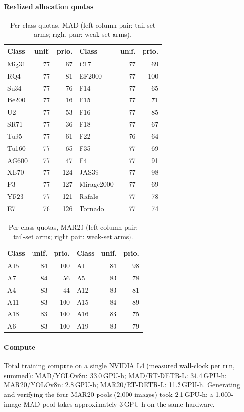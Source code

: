 \paragraph{Realized allocation quotas}
\begin{table}[h]\centering\small\caption{Per-class quotas, MAD (left column pair: tail-set arms; right pair: weak-set arms).}
\begin{tabular}{lrr@{\qquad}lrr}\toprule
Class & unif. & prio. & Class & unif. & prio. \\ \midrule
Mig31 & 77 & 67 & C17 & 77 & 69 \\
RQ4 & 77 & 81 & EF2000 & 77 & 100 \\
Su34 & 77 & 76 & F14 & 77 & 65 \\
Be200 & 77 & 16 & F15 & 77 & 71 \\
U2 & 77 & 53 & F16 & 77 & 85 \\
SR71 & 77 & 36 & F18 & 77 & 67 \\
Tu95 & 77 & 61 & F22 & 76 & 64 \\
Tu160 & 77 & 65 & F35 & 77 & 69 \\
AG600 & 77 & 47 & F4 & 77 & 91 \\
XB70 & 77 & 124 & JAS39 & 77 & 98 \\
P3 & 77 & 127 & Mirage2000 & 77 & 69 \\
YF23 & 77 & 121 & Rafale & 77 & 78 \\
E7 & 76 & 126 & Tornado & 77 & 74 \\
\bottomrule\end{tabular}\end{table}
\begin{table}[h]\centering\small\caption{Per-class quotas, MAR20 (left column pair: tail-set arms; right pair: weak-set arms).}
\begin{tabular}{lrr@{\qquad}lrr}\toprule
Class & unif. & prio. & Class & unif. & prio. \\ \midrule
A15 & 84 & 100 & A1 & 84 & 98 \\
A7 & 84 & 56 & A5 & 83 & 78 \\
A4 & 83 & 44 & A12 & 83 & 81 \\
A11 & 83 & 100 & A15 & 84 & 89 \\
A18 & 83 & 100 & A16 & 83 & 75 \\
A6 & 83 & 100 & A19 & 83 & 79 \\
\bottomrule\end{tabular}\end{table}
\paragraph{Compute}
Total training compute on a single NVIDIA L4 (measured wall-clock per run, summed): MAD/YOLOv8n: 33.0\,GPU-h; MAD/RT-DETR-L: 34.4\,GPU-h; MAR20/YOLOv8n: 2.8\,GPU-h; MAR20/RT-DETR-L: 11.2\,GPU-h. Generating and verifying the four MAR20 pools (2{,}000 images) took 2.1\,GPU-h; a 1{,}000-image MAD pool takes approximately 3\,GPU-h on the same hardware.

